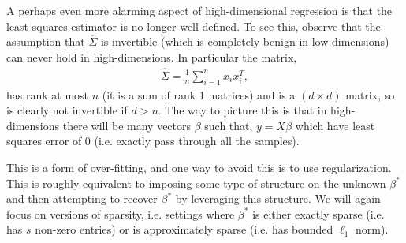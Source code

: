 \documentclass[twoside,12pt]{article}
\begin{document}
A perhaps even more alarming aspect of high-dimensional regression is that the least-squares estimator is no longer well-defined. To see this, observe that the assumption that $\widehat{\Sigma}$ is invertible (which is completely benign in low-dimensions) can never hold in high-dimensions. In particular the matrix,
\begin{align*}
\widehat{\Sigma} = \frac{1}{n} \sum_{i=1}^n x_i x_i^T,
\end{align*}
has rank at most $n$ (it is a sum of rank 1 matrices) and is a $(d \times d)$ matrix, so is clearly not invertible if $d > n$. The way to picture this is that in high-dimensions there will be many vectors $\beta$ such that, $y = X\beta$ which have least squares error of 0 (i.e. exactly pass through all the samples).

This is a form of over-fitting, and one way to avoid this is to use regularization. This is roughly equivalent to imposing some type of structure on the unknown $\beta^*$ and then attempting to recover $\beta^*$ by leveraging this structure. We will again focus on versions of sparsity, i.e. settings where $\beta^*$ is either exactly sparse (i.e. has $s$ non-zero entries) or is approximately sparse (i.e. has bounded $\ell_1$ norm).
\end{document}
